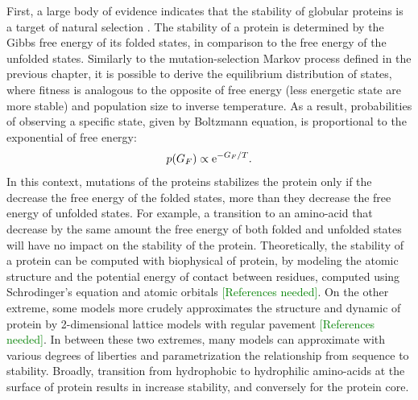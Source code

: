 First, a large body of evidence indicates that the stability of globular proteins is a target of natural selection \citep{Sikosek2014}.
The stability of a protein is determined by the Gibbs free energy of its folded states, in comparison to the free energy of the unfolded states.
Similarly to the mutation-selection Markov process defined in the previous chapter, it is possible to derive the equilibrium distribution of states, where fitness is analogous to the opposite of free energy (less energetic state are more stable) and population size to inverse temperature.
As a result, probabilities of observing a specific state, given by Boltzmann equation, is proportional to the exponential of free energy:
\begin{align}
p(G_F)\propto \mathrm{e}^{- G_F / T}.
\end{align}
In this context, mutations of the proteins stabilizes the protein only if the decrease the free energy of the folded states, more than they decrease the free energy of unfolded states.
For example, a {transition} to an amino-acid that decrease by the same amount the free energy of both folded and unfolded states will have no impact on the stability of the protein.
Theoretically, the stability of a protein can be computed with biophysical of protein, by modeling the atomic structure and the potential energy of contact between residues, computed using Schrodinger's equation and atomic orbitals \textcolor{GREEN}{[References needed]}.
On the other extreme, some models more crudely approximates the structure and dynamic of protein by 2-dimensional lattice models with regular pavement \textcolor{GREEN}{[References needed]}. 
In between these two extremes, many models can approximate with various degrees of liberties and parametrization the relationship from sequence to stability.
Broadly, {transition} from hydrophobic to hydrophilic amino-acids at the surface of protein results in increase stability, and conversely for the protein core.

